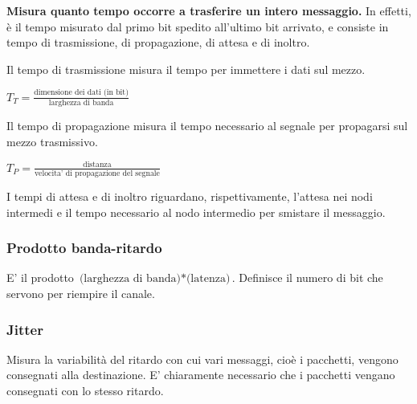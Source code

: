             \textbf{Misura quanto tempo occorre a trasferire un intero messaggio.} In effetti, è il tempo misurato dal primo bit spedito  all'ultimo bit arrivato, e consiste in tempo di trasmissione, di propagazione, di attesa e di inoltro.
            
            \vspace{3mm}
            
            Il tempo di trasmissione misura il tempo per immettere i dati sul mezzo.
            
            \begin{center}
                \(T_T = \frac{\text{dimensione dei dati (in bit)}}{\text{larghezza di banda}}\)
            \end{center}
            
            Il tempo di propagazione misura il tempo necessario al segnale per propagarsi sul mezzo trasmissivo.
            
            \begin{center}
                \(T_P = \frac{\text{distanza}}{\text{velocita' di propagazione del segnale}}\)
            \end{center}
            
            I tempi di attesa e di inoltro riguardano, rispettivamente, l'attesa nei nodi intermedi e il tempo necessario al nodo intermedio per smistare il messaggio.
            
        \subsubsection{Prodotto banda-ritardo}
        
            E' il prodotto \(\text{(larghezza di banda)}*\text{(latenza)}\). Definisce il numero di bit che servono per riempire il canale.
            
        \subsubsection{Jitter}
        
            Misura la variabilità del ritardo con cui vari messaggi, cioè i pacchetti, vengono consegnati alla destinazione. E' chiaramente necessario che i pacchetti vengano consegnati con lo stesso ritardo.